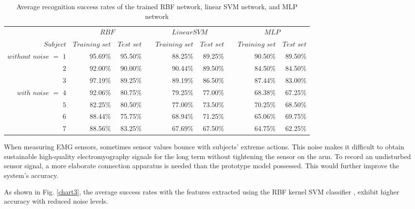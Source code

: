 \newcommand{\ra}[1]{\renewcommand{\arraystretch}{#1}}
\tabcolsep=0.11cm
\begin{table*}
\footnotesize

\caption{Average recognition success rates of the trained RBF network, linear SVM network, and MLP network}
\centering
\ra{1.3}
\begin{tabular}{@{}rrrcrrcrr@{}}\toprule
\hline\hline %
& \multicolumn{2}{c}{$RBF$} & \phantom{abc}& \multicolumn{2}{c}{$Linear SVM$} &
\phantom{abc} & \multicolumn{2}{c}{$MLP$}\\
$Subject$ & $Training$ $set$ & $Test$ $set$ && $Training$ $set$ & $Test$ $set$ && $Training$ $set$ & $Test$ $set$\\ \midrule
\hline
$without$ $noise$ $=$ $1$ & 95.69\% & 95.50\% && 88.25\% & 89.25\% && 90.50\% & 89.50\%\\
$2$ & 92.00\% & 90.00\% && 90.44\% & 89.50\% && 84.50\% & 84.50\%\\
$3$ & 97.19\% & 89.25\% && 89.19\% & 86.50\% && 87.44\% & 83.00\%\\
\hline
$with$ $noise$ $=$ $4$ & 92.06\% & 80.75\% && 79.25\% & 77.00\% && 68.38\% & 67.25\%\\
$5$ & 82.25\% & 80.50\% && 77.00\% & 73.50\% && 70.25\% & 68.50\%\\
$6$ & 88.44\% & 75.75\% && 68.94\% & 71.25\% && 65.06\% & 69.75\%\\
$7$ & 88.56\% & 83.25\% && 67.69\% & 67.50\% && 64.75\% & 62.25\%\\



\bottomrule
\hline
\end{tabular}

\end{table*}

When measuring EMG sensors, sometimes sensor values bounce with
subjects' extreme actions.  This noise makes it difficult to obtain
sustainable high-quality electromyography signals for the long term
without tightening the sensor on the arm.  To record an undisturbed
sensor signal, a more elaborate connection apparatus is needed than
the prototype model possessed.  This would further improve the
system's accuracy.

As shown in Fig. \ref{chart3}, the average success rates with the
features extracted using the RBF kernel SVM classifier
\cite{ML1}\cite{ML2}, exhibit higher accuracy with reduced noise
levels.

